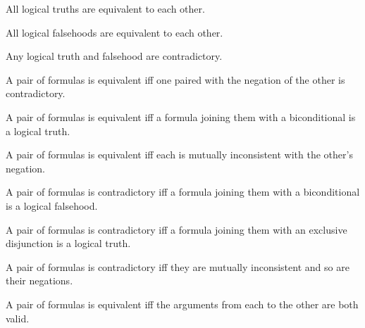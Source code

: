 \documentclass[PHIL101-Textbook.tex]{subfiles}
\begin{document}
\begin{earg}
\item All logical truths are equivalent to each other.
\item All logical falsehoods are equivalent to each other.
\item Any logical truth and falsehood are contradictory.
\item A pair of formulas is equivalent iff one paired with the negation of the other is contradictory.
\item A pair of formulas is equivalent iff a formula joining them with a biconditional is a logical truth.
\item A pair of formulas is equivalent iff each is mutually inconsistent with the other's negation.
\item A pair of formulas is contradictory iff a formula joining them with a biconditional is a logical falsehood.
\item A pair of formulas is contradictory iff a formula joining them with an exclusive disjunction is a logical truth.
\item A pair of formulas is contradictory iff they are mutually inconsistent and so are their negations.
\item A pair of formulas is equivalent iff the arguments from each to the other are both valid.

\end{earg}



%
%
%
\end{document}
